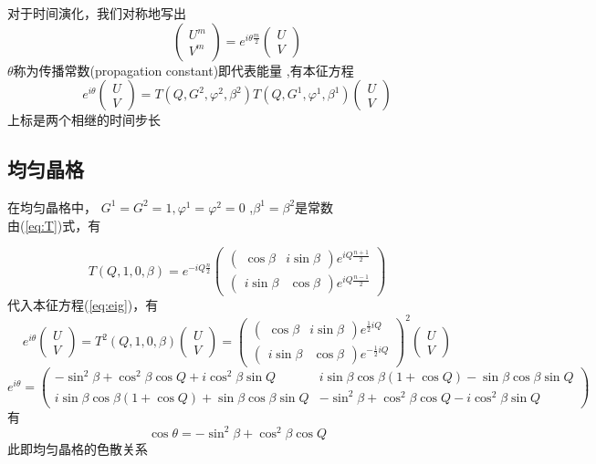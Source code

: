 \documentclass[hyperref,UTF8]{ctexart}
\begin{document}
对于时间演化，我们对称地写出
\[\begin{pmatrix}
    U^{m}\\V^{m}
\end{pmatrix}=e^{i\theta\frac{m}{2}}\begin{pmatrix}
    U\\V
\end{pmatrix}\]
$\theta$称为传播常数(propagation constant)即代表能量 ,有本征方程
\begin{equation}
 e^{i\theta}\begin{pmatrix}
    U\\V
\end{pmatrix}=T(Q,G^2,\varphi^2,\beta^2)T(Q,G^1,\varphi^1,\beta^1)\begin{pmatrix}
    U\\V
\end{pmatrix}\label{eq:eig}
\end{equation}
上标是两个相继的时间步长
\subsection*{均匀晶格}
在均匀晶格中， $G^1=G^2=1,\varphi^1=\varphi^2=0$ ,$\beta^1=\beta^2$是常数\\
由(\ref{eq:T})式，有

\[T(Q,1,0,\beta)=e^{-iQ\frac{n}{2}}\begin{pmatrix}
    \begin{pmatrix}
        \cos \beta& i \sin \beta
    \end{pmatrix}e^{iQ\frac{n+1}{2}}\\
    \begin{pmatrix}
        i \sin \beta& \cos \beta
    \end{pmatrix}e^{iQ\frac{n-1}{2}}
\end{pmatrix}\]
代入本征方程(\ref{eq:eig})，有
\[e^{i\theta}\begin{pmatrix}
    U\\V
\end{pmatrix}=T^2(Q,1,0,\beta)\begin{pmatrix}
    U\\V
\end{pmatrix}=\begin{pmatrix}
    \begin{pmatrix}
        \cos \beta& i \sin \beta
    \end{pmatrix}e^{\frac{1}{2}iQ}\\
    \begin{pmatrix}
        i \sin \beta& \cos \beta
    \end{pmatrix}e^{-\frac{1}{2}iQ}
\end{pmatrix}^2\begin{pmatrix}
    U\\V
\end{pmatrix}\]
\[e^{i\theta}=
\begin{pmatrix}
-\sin ^2\beta+\cos ^2\beta \cos Q+i \cos ^2\beta \sin Q & 
i \sin \beta \cos \beta(1+ \cos Q)-\sin \beta \cos \beta \sin Q \\
i \sin \beta \cos \beta(1+\cos Q)+\sin \beta \cos \beta \sin Q & 
-\sin ^2\beta+\cos ^2\beta \cos Q-i \cos ^2\beta \sin Q 
\end{pmatrix}\]
有
\[\cos \theta = -\sin ^2\beta+\cos ^2\beta \cos Q\]
此即均匀晶格的色散关系
\end{document}
